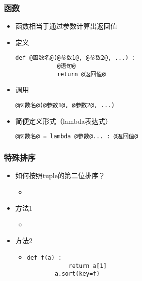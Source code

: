 \begin{CJK}{UTF8}{gbsn}
\begin{frame} [fragile]
	\frametitle{函数}
	\begin{itemize}
	\item 函数相当于通过参数计算出返回值
	\item 定义
		\begin{lstlisting}[style=pythonstyle, gobble=8, texcl, escapechar=@]
		def @函数名@(@参数1@, @参数2@, ...) :
			@语句@
			return @返回值@
		\end{lstlisting}
	\item 调用
		\begin{lstlisting}[style=pythonstyle, gobble=8, texcl, escapechar=@]
		@函数名@(@参数1@, @参数2@, ...)
		\end{lstlisting}
	\item 简便定义形式（lambda表达式）
		\begin{lstlisting}[style=pythonstyle, gobble=8, texcl, escapechar=@]
		@函数名@ = lambda @参数@... : @返回值@
		\end{lstlisting}
	\end{itemize}
\end{frame}

\begin{frame} [fragile]
	\frametitle{特殊排序}
	\linespread{1.25}
	\begin{itemize}
	\item 如何按照tuple的第二位排序？
		\begin{itemize}
		\item {}
		\end{itemize}
	\item 方法1
		\begin{itemize}
		\item {}
		\end{itemize}
	\item 方法2
		\begin{itemize}
		\item
		\begin{lstlisting}[style=pythonstyle, gobble=8, texcl, escapechar=@]
		def f(a) :
			return a[1]
		a.sort(key=f)
		\end{lstlisting}
		\end{itemize}
	\end{itemize}
\end{frame}


\end{CJK}
